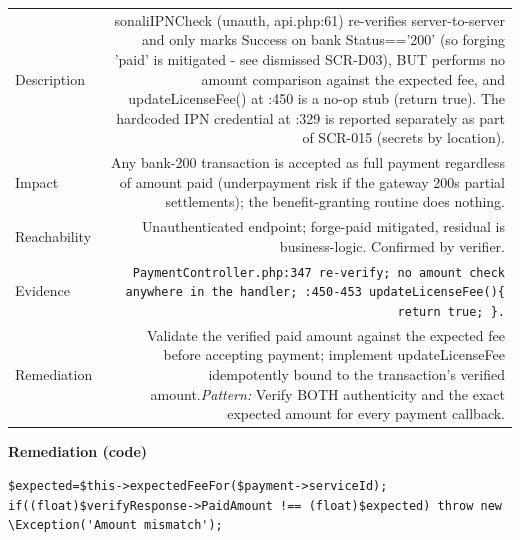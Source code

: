 \documentclass[11pt,a4paper]{article}
\begin{document}
{\renewcommand{\arraystretch}{1.35}%
\begin{tabularx}{\textwidth}{L R}
\toprule
Description & sonaliIPNCheck (unauth, api.php:61) re-verifies server-to-server and only marks Success on bank Status=='200' (so forging 'paid' is mitigated - see dismissed SCR-D03), BUT performs no amount comparison against the expected fee, and updateLicenseFee() at :450 is a no-op stub (return true). The hardcoded IPN credential at :329 is reported separately as part of SCR-015 (secrets by location). \\
Impact & Any bank-200 transaction is accepted as full payment regardless of amount paid (underpayment risk if the gateway 200s partial settlements); the benefit-granting routine does nothing. \\
Reachability & Unauthenticated endpoint; forge-paid mitigated, residual is business-logic. Confirmed by verifier. \\
Evidence & \texttt{\small PaymentController.php:347 re-verify; no amount check anywhere in the handler; :450-453 updateLicenseFee()\{ return true; \}.} \\
Remediation & Validate the verified paid amount against the expected fee before accepting payment; implement updateLicenseFee idempotently bound to the transaction's verified amount.\newline\emph{Pattern:} Verify BOTH authenticity and the exact expected amount for every payment callback. \\
\bottomrule
\end{tabularx}}

\vspace{4pt}\noindent\textbf{Remediation (code)}\par
\begin{lstlisting}
$expected=$this->expectedFeeFor($payment->serviceId);
if((float)$verifyResponse->PaidAmount !== (float)$expected) throw new \Exception('Amount mismatch');
\end{lstlisting}
\end{document}
